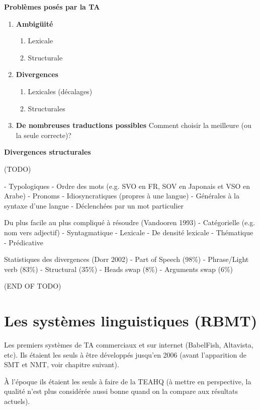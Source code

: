 \noindent\textbf{Problèmes posés par la TA}

\begin{enumerate}
    \item \textbf{Ambigüité}
    \begin{enumerate}
        \item Lexicale
        \item Structurale
    \end{enumerate}
    \item \textbf{Divergences}
    \begin{enumerate}
        \item Lexicales (décalages)
        \item Structurales
    \end{enumerate}
    \item \textbf{De nombreuses traductions possibles}
        Comment choisir la meilleure (ou la seule correcte)?
\end{enumerate}

\noindent\textbf{Divergences structurales\\}

(TODO)

- Typologiques
    - Ordre des mots (e.g. SVO en FR, SOV en Japonais et VSO en Arabe)
    - Pronoms
- Idiosyncratiques (propres à une langue)
- Générales à la syntaxe d'une langue
- Déclenchées par un mot particulier

Du plus facile au plus compliqué à résoudre (Vandooren 1993)
- Catégorielle (e.g. nom vers adjectif)
- Syntagmatique
- Lexicale
- De densité lexicale
- Thématique
- Prédicative

Statistiques des divergences (Dorr 2002)
- Part of Speech (98\%)
- Phrase/Light verb (83\%)
- Structural (35\%)
- Heads swap (8\%)
- Arguments swap (6\%)

(END OF TODO)

\newpage

\section{Les systèmes linguistiques (RBMT)}
\label{sec:RBMT}

Les premiers systèmes de TA commerciaux et sur internet (BabelFish, Altavista, etc).
Ils étaient les seuls à être développés jusqu'en 2006 (avant l'apparition de SMT et NMT, voir chapitre suivant).

À l'époque ils étaient les seuls à faire de la TEAHQ (à mettre en perspective, la qualité n'est plus considérée aussi bonne quand on la compare aux résultats actuels).

